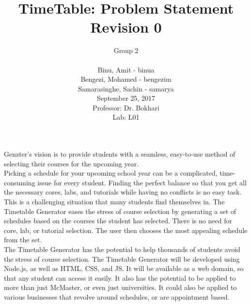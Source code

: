 \documentclass[12pt]{article}
\title{TimeTable: Problem Statement Revision 0}
\author{Group 2 \\
		\\ Binu, Amit - binua
		\\ Bengezi, Mohamed - bengezim
		\\ Samarasinghe, Sachin - samarya
		\\ September 25, 2017
		\\Professor: Dr. Bokhari
		\\ Lab: L01}
\date{}
\begin{document}
\maketitle
Genzter’s vision is to provide students with a seamless, easy-to-use method of selecting their courses for the upcoming year.\\
 
Picking a schedule for your upcoming school year can be a complicated, time-consuming issue for every student. Finding the perfect balance so that you get all the necessary cores, labs, and tutorials while having no conflicts is no easy task. This is a challenging situation that many students find themselves in. The Timetable Generator eases the stress of course selection by generating a set of schedules based on the courses the student has selected. There is no need for core, lab, or tutorial selection. The user then chooses the most appealing schedule from the set. \\

The Timetable Generator has the potential to help thousands of students avoid the stress of course selection. The Timetable Generator will be developed using Node.js, as well as HTML, CSS, and JS. It will be available as a web domain, so that any student can access it easily. It also has the potential to be applied to more than just McMaster, or even just universities. It could also be applied to various businesses that revolve around schedules, or are appointment based. 

    



\end{document}
